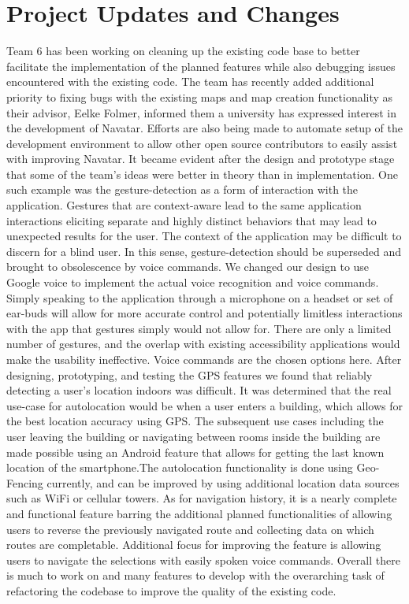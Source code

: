 \documentclass{scrreprt}
\begin{document}
\chapter{Project Updates and Changes}
Team 6 has been working on cleaning up the existing code base to better facilitate the implementation of the planned features while also debugging issues encountered with the existing code. The team has recently added additional priority to fixing bugs with the existing maps and map creation functionality as their advisor, Eelke Folmer, informed them a university has expressed interest in the development of Navatar. Efforts are also being made to automate setup of the development environment to allow other open source contributors to easily assist with improving Navatar.
It became evident after the design and prototype stage that some of the team's ideas were better in theory than in implementation. One such example was the gesture-detection as a form of interaction with the application. Gestures that are context-aware lead to the same application interactions eliciting separate and highly distinct behaviors that may lead to unexpected results for the user. The context of the application may be difficult to discern for a blind user. In this sense, gesture-detection should be superseded and brought to obsolescence by voice commands. We changed our design to use Google voice to implement the actual voice recognition and voice commands. Simply speaking to the application through a microphone on a headset or set of ear-buds will allow for more accurate control and potentially limitless interactions with the app that gestures simply would not allow for. There are only a limited number of gestures, and the overlap with existing accessibility applications would make the usability ineffective. Voice commands are the chosen options here. After designing, prototyping, and testing the GPS features we found that reliably detecting a user’s location indoors was difficult. It was determined that the real use-case for autolocation would be when a user enters a building, which allows for the best location accuracy using GPS. The subsequent use cases including the user leaving the building or navigating between rooms inside the building are made possible using an Android feature that allows for getting the last known location of the smartphone.The autolocation functionality is done using Geo-Fencing currently, and can be improved by using additional location data sources such as WiFi or cellular towers. As for navigation history, it is a nearly complete and functional feature barring the additional planned functionalities of allowing users to reverse the previously navigated route and collecting data on which routes are completable. Additional focus for improving the feature is allowing users to navigate the selections with easily spoken voice commands. Overall there is much to work on and many features to develop with the overarching task of refactoring the codebase to improve the quality of the existing code.
\end{document}
